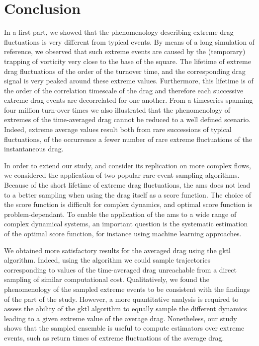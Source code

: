 \documentclass{jfm}
\begin{document}
\section{Conclusion}
\label{conlusion}

In a first part, we showed that the phenomenology describing extreme drag fluctuations is very different from typical events.
By means of a long simulation of reference, we observed that such extreme events are caused by the (temporary) trapping of vorticity very close to the base of the square.
The lifetime of extreme drag fluctuations of the order of the turnover time, and the corresponding drag signal is very peaked around these extreme values.
Furthermore, this lifetime is of the order of the correlation timescale of the drag and therefore each successive extreme drag events are decorrelated for one another.
From a timeseries spanning four million turn-over times we also illustrated that the phenomenology of extremes of the time-averaged drag cannot be reduced to a well defined scenario.
Indeed, extreme average values result both from rare successions of typical fluctuations, of the occurrence a fewer number of rare extreme fluctuations of the instantaneous drag.

In order to extend our study, and consider its replication on more complex flows, we considered the application of two popular rare-event sampling algorithms.
Because of the short lifetime of extreme drag fluctuations, the \ac{ams} does not lead to a better sampling
when using the drag itself as a score function.
The choice of the score function is difficult for complex dynamics, and optimal score function is problem-dependant.
To enable the application of the \ac{ams} to a wide range of complex dynamical systems, an important question is the systematic estimation of the optimal score function, for instance using machine learning approaches.

We obtained more satisfactory results for the averaged drag using the \ac{gktl} algorithm.
Indeed, using the algorithm we could sample trajectories corresponding to values of the time-averaged drag unreachable from a direct sampling of similar computational cost.
Qualitatively, we found the phenomenology of the sampled extreme events to be consistent with the findings of the part of the study.
However, a more quantitative analysis is required to assess the ability of the \ac{gktl} algorithm to equally sample the different dynamics leading to a given extreme value of the average drag.
Nonetheless, our study shows that the sampled ensemble is useful to compute estimators over extreme events, such as return times of extreme fluctuations of the average drag.
\end{document}
